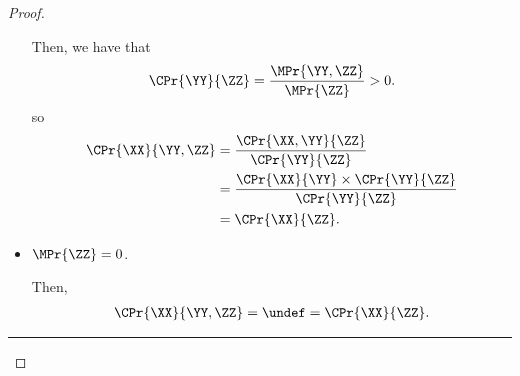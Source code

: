 \begin{proof}
\begin{itemize}
      Then, we have that
      $$\CPr{\YY}{\ZZ} = \frac{\MPr{ \YY, \ZZ}}{\MPr{\ZZ}} > 0.$$
      so
      \begin{align*}
        \CPr{\XX}{\YY, \ZZ}
        &= 
        \frac{\CPr{\XX, \YY}{\ZZ}}{\CPr{\YY}{\ZZ}}
        \\
        &= \frac{\CPr{\XX}{\YY} \times \CPr{\YY}{\ZZ}}{\CPr{\YY}{\ZZ}}\\
        &= \CPr{\XX}{\ZZ}.
      \end{align*}
    \item $\MPr{\ZZ} = 0$.

      Then,
      \begin{align*}
        \CPr{\XX}{\YY, \ZZ}
        = 
        \undef
        = \CPr{\XX}{\ZZ}.
      \end{align*}
  \end{itemize}
  \hrule
\end{proof}
